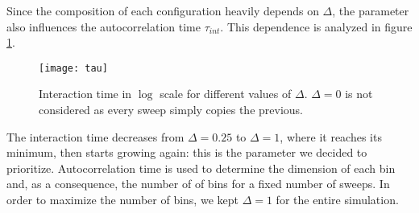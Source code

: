 Since the composition of each configuration heavily depends on $\Delta$,
the parameter also influences the autocorrelation time $\tau_{int}$.
This dependence is analyzed in figure \ref{fig:taudelta}.
\begin{figure}[h!]
  \centering
  \texttt{[image: tau]}
  \caption{\label{fig:taudelta}Interaction time in $\log$ scale for different values of $\Delta$. $\Delta = 0$ is not considered as every
  sweep simply copies the previous.}
\end{figure}

The interaction time decreases from $\Delta = 0.25$ to $\Delta = 1$, where it reaches its minimum, then starts growing again: this is
the parameter we decided to prioritize. Autocorrelation time is used to determine the dimension of each bin and, as a consequence, the number of
of bins for a fixed number of sweeps. In order to maximize the number of bins, we kept $\Delta = 1$ for the entire simulation.
